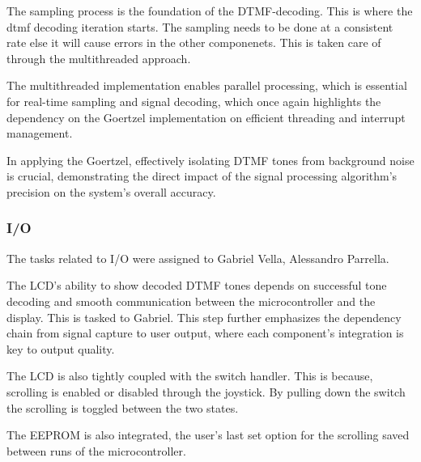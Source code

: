 \documentclass{cce2014-design}
\begin{document}
The sampling process is the foundation of the DTMF-decoding. This is where the 
dtmf decoding iteration starts. The sampling needs to be done at a consistent 
rate else it will cause errors in the other componenets. This is taken care 
of through the multithreaded approach. 

The multithreaded implementation enables parallel processing, which is
essential for real-time sampling and signal decoding, which once again
highlights the dependency on the Goertzel implementation on efficient
threading and interrupt management.

In applying the Goertzel, effectively isolating DTMF tones from
background noise is crucial, demonstrating the direct impact of the signal
processing algorithm's precision on the system's overall accuracy.

\subsubsection{I/O}
The tasks related to I/O were assigned to Gabriel Vella, Alessandro Parrella.

The LCD's ability to show decoded DTMF tones depends on
successful tone decoding and smooth communication between the microcontroller
and the display. This is tasked to Gabriel. This step further emphasizes the
dependency chain from signal capture to user output, where each component's
integration is key to output quality.

The LCD is also tightly coupled with the switch handler. This is because,
scrolling is enabled or disabled through the joystick. By pulling down the
switch the scrolling is toggled between the two states.

The EEPROM is also integrated, the user's last set option for the scrolling
saved between runs of the microcontroller.
\end{document}
